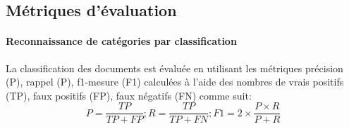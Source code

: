 


%

\subsection{Métriques d'évaluation}
\paragraph{Reconnaissance de catégories par classification}

La classification des documents est évaluée en utilisant les métriques précision (P), rappel (P), f1-mesure (F1) calculées à l'aide des nombres de vrais positifs (TP), faux positifs (FP), faux négatifs (FN) comme suit:
\[P = \frac{TP}{TP+FP}; R = \frac{TP}{TP+FN}; F1 = 2 \times \frac{P \times R}{P + R}\]

